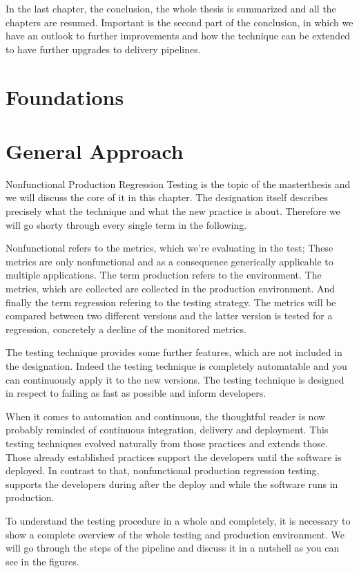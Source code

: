 In the last chapter, the conclusion, the whole thesis is summarized and all the chapters are resumed. Important is the second part of the conclusion, in which we have an outlook to further improvements and how the technique can be extended to have further upgrades to delivery pipelines.

\chapter{Foundations}

\chapter{General Approach}

Nonfunctional Production Regression Testing is the topic of the masterthesis and we will discuss the core of it in this chapter. The designation itself describes precisely what the technique and what the new practice is about. Therefore we will go shorty through every single term in the following.

Nonfunctional refers to the metrics, which we're evaluating in the test; These metrics are only nonfunctional and as a consequence generically applicable to multiple applications. The term production refers to the environment. The metrics, which are collected are collected in the production environment. And finally the term regression refering to the testing strategy. The metrics will be compared between two different versions and the latter version is tested for a regression, concretely a decline of the monitored metrics.

The testing technique provides some further features, which are not included in the designation. Indeed the testing technique is completely automatable and you can continuously apply it to the new versions. The testing technique is designed in respect to failing as fast as possible and inform developers.

When it comes to automation and continuous, the thoughtful reader is now probably reminded of continuous integration, delivery and deployment. This testing techniques evolved naturally from those practices and extends those. Those already established practices support the developers until the software is deployed. In contrast to that, nonfunctional production regression testing, supports the developers during after the deploy and while the software runs in production.

To understand the testing procedure in a whole and completely, it is necessary to show a complete overview of the whole testing and production environment. We will go through the steps of the pipeline and discuss it in a nutshell as you can see in the figures.

